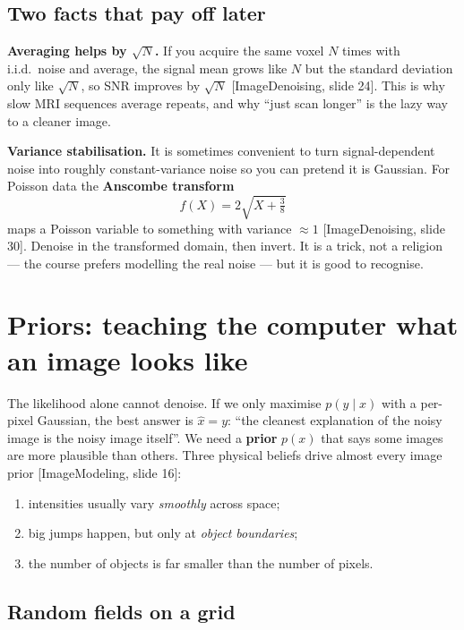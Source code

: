 \documentclass[11pt]{article}
\newcommand{\xhat}{\hat{x}}
\newcommand{\deck}[1]{\textsf{\small[#1]}}
\begin{document}
\subsection{Two facts that pay off later}

\textbf{Averaging helps by $\sqrt{N}$.} If you acquire the same voxel $N$ times
with i.i.d.\ noise and average, the signal mean grows like $N$ but the standard
deviation only like $\sqrt N$, so SNR improves by $\sqrt N$
\deck{ImageDenoising, slide 24}. This is why slow MRI sequences average repeats,
and why ``just scan longer'' is the lazy way to a cleaner image.

\textbf{Variance stabilisation.} It is sometimes convenient to turn
signal-dependent noise into roughly constant-variance noise so you can pretend
it is Gaussian. For Poisson data the \textbf{Anscombe transform}
\[
f(X) = 2\sqrt{X + \tfrac{3}{8}}
\]
maps a Poisson variable to something with variance $\approx 1$
\deck{ImageDenoising, slide 30}. Denoise in the transformed domain, then invert.
It is a trick, not a religion --- the course prefers modelling the real noise
--- but it is good to recognise.

\section{Priors: teaching the computer what an image looks like}

The likelihood alone cannot denoise. If we only maximise $p(y\mid x)$ with a
per-pixel Gaussian, the best answer is $\xhat = y$: ``the cleanest explanation
of the noisy image is the noisy image itself''. We need a \textbf{prior}
$p(x)$ that says some images are more plausible than others. Three physical
beliefs drive almost every image prior \deck{ImageModeling, slide 16}:
\begin{enumerate}[nosep,leftmargin=*]
  \item intensities usually vary \emph{smoothly} across space;
  \item big jumps happen, but only at \emph{object boundaries};
  \item the number of objects is far smaller than the number of pixels.
\end{enumerate}

\subsection{Random fields on a grid}
\end{document}
